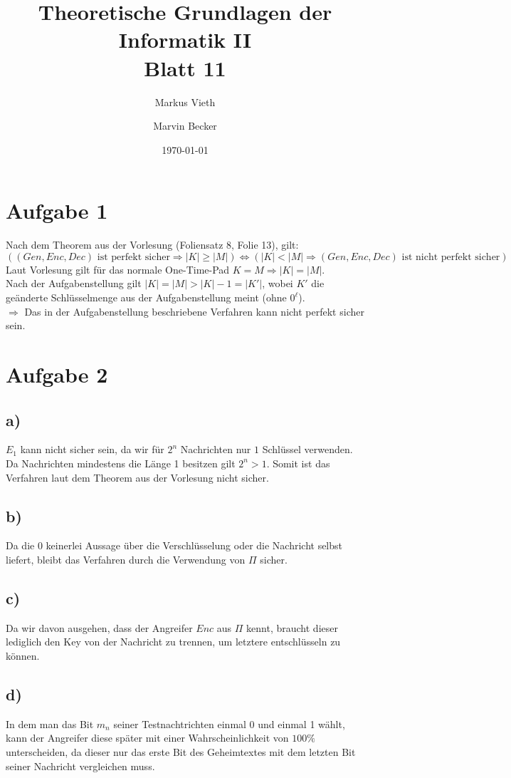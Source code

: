 \documentclass[a4paper,11pt,twoside]{scrartcl}
\title{Theoretische Grundlagen der Informatik II\\ Blatt 11}
\author{Markus Vieth \and Marvin Becker}
\date{\today}
\begin{document}
\maketitle
\cleardoublepage
\pagestyle{myheadings}

\section*{Aufgabe 1}
Nach dem Theorem aus der Vorlesung (Foliensatz 8, Folie 13), gilt:
\[ ((Gen,Enc,Dec)\text{ ist perfekt sicher} \Rightarrow |K|\geq |M|) \Leftrightarrow (|K|<|M|\Rightarrow (Gen,Enc,Dec)\text{ ist nicht perfekt sicher})  \]
Laut Vorlesung gilt für das normale One-Time-Pad $K=M\Rightarrow |K|=|M|$.\\
Nach der Aufgabenstellung gilt $|K|=|M|>|K|-1=|K'|$, wobei $K'$ die geänderte Schlüsselmenge aus der Aufgabenstellung meint (ohne $0^\ell$).\\
$\Rightarrow$ Das in der Aufgabenstellung beschriebene Verfahren kann nicht perfekt sicher sein.
\section*{Aufgabe 2}
\subsection*{a)}
$E_1$ kann nicht sicher sein, da wir für $2^n$ Nachrichten nur $1$ Schlüssel verwenden. Da Nachrichten mindestens die Länge 1 besitzen gilt $2^n>1$. Somit ist das Verfahren laut dem Theorem aus der Vorlesung nicht sicher.
\subsection*{b)}
Da die $0$ keinerlei Aussage über die Verschlüsselung oder die Nachricht selbst liefert, bleibt das Verfahren durch die Verwendung von $\Pi$ sicher.
\subsection*{c)}
Da wir davon ausgehen, dass der Angreifer $Enc$ aus $\Pi$ kennt, braucht dieser lediglich den Key von der Nachricht zu trennen, um letztere entschlüsseln zu können.
\subsection*{d)}
In dem man das Bit $m_n$ seiner Testnachtrichten einmal 0 und einmal 1 wählt, kann der Angreifer diese später mit einer Wahrscheinlichkeit von $100\%$ unterscheiden, da dieser nur das erste Bit des Geheimtextes mit dem letzten Bit seiner Nachricht vergleichen muss.
\end{document}
